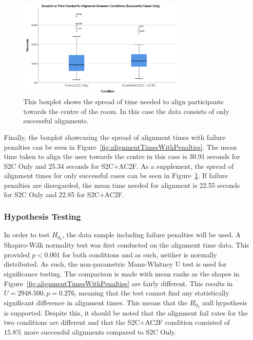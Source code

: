 \begin{figure}[tbph]
    \centering
    \includegraphics[width=0.75\textwidth]{figures/graphs/boxplotAlignmentTimesWithoutPenalties.png}
    \caption[Boxplot on Time Needed To Align Participants To Centre (Successful Cases Only)]{This boxplot shows the spread of time needed to align participants towards the centre of the room. In this case the data consists of only successful alignments.}
    \label{fig:AlignmentTimesWithoutPenalties}
\end{figure}

Finally, the boxplot showcasing the spread of alignment times with failure penalties can be seen in Figure~\ref{fig:alignmentTimesWithPenalties}. The mean time taken to align the user towards the centre in this case is 30.91 seconds for S2C Only and 25.34 seconds for S2C+AC2F. As a supplement, the spread of alignment times for only successful cases can be seen in Figure~\ref{fig:AlignmentTimesWithoutPenalties}. If failure penalties are disregarded, the mean time needed for alignment is 22.55 seconds for S2C Only and 22.85 for S2C+AC2F. 

\subsubsection{Hypothesis Testing}
In order to test $H_{0_2}$, the data sample including failure penalties will be used. A Shapiro-Wilk normality test was first conducted on the alignment time data. This provided $p < 0.001$ for both conditions and as such, neither is normally distributed. As such, the non-parametric Mann-Whitney U test is used for significance testing. The comparison is made with mean ranks as the shapes in Figure~\ref{fig:alignmentTimesWithPenalties} are fairly different. This results in $U = 2948.500, p = 0.276$, meaning that the test cannot find any statistically significant difference in alignment times. This means that the $H_{0_2}$ null hypothesis is supported. Despite this, it should be noted that the alignment fail rates for the two conditions are different and that the S2C+AC2F condition consisted of $15.8\%$ more successful alignments compared to S2C Only. 

